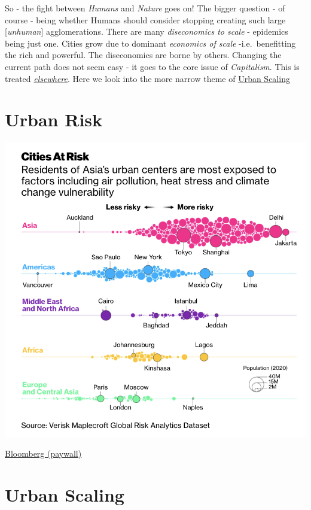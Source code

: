 \documentclass[
]{book}
\begin{document}
So - the fight between \emph{Humans} and \emph{Nature} goes on!
The bigger question - of course - being whether Humans should consider stopping creating such
large {[}\emph{unhuman}{]} agglomerations. There are many \emph{diseconomics to scale} - epidemics being just one.
Cities grow due to dominant \emph{economics of scale} -i.e.~benefitting the rich and powerful.
The diseconomics are borne by others. Changing the current path does not seem easy -
it goes to the core issue of \emph{Capitalism}. This is treated \href{https://dyrehaugen.github.io/jdt/cap_urbanisation.html\#the-urban-dimension}{\emph{elsewhere}}.
Here we look into the more narrow theme of
\href{/docs/03-urban-scaling}{Urban Scaling}

\hypertarget{urban-risk}{%
\chapter{Urban Risk}\label{urban-risk}}

\includegraphics{fig/urban_risk.png}

\href{https://www.bloomberg.com/news/articles/2021-05-12/asian-cities-face-greatest-environmental-risks-report-shows}{Bloomberg (paywall)}

\hypertarget{urban-scaling}{%
\chapter{Urban Scaling}\label{urban-scaling}}
\end{document}
